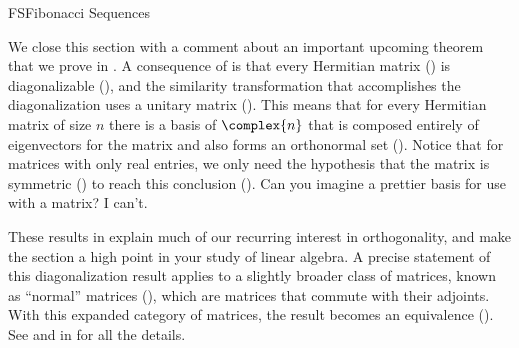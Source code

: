 \begin{subsect}{FS}{Fibonacci Sequences}
\begin{para}We close this section with a comment about an important upcoming theorem that we prove in .  A consequence of  is that every Hermitian matrix () is diagonalizable (), and the similarity transformation that accomplishes the diagonalization uses a unitary matrix ().  This means that for every Hermitian matrix of size $n$ there is a basis of $\complex{n}$  that is composed entirely of eigenvectors for the matrix and also forms an orthonormal set ().  Notice that for matrices with only real entries, we only need the hypothesis that the matrix is symmetric () to reach this conclusion ().  Can you imagine a prettier basis for use with a matrix?  I can't.\end{para}
%
\begin{para}These results in  explain much of our recurring interest in orthogonality, and make the section a high point in your study of linear algebra.  A precise statement of this diagonalization result applies to a slightly broader class of matrices, known as ``normal'' matrices (), which are matrices that commute with their adjoints.  With this expanded category of matrices, the result becomes an equivalence ().  See  and  in  for all the details.\end{para}
%
\end{subsect}
%
